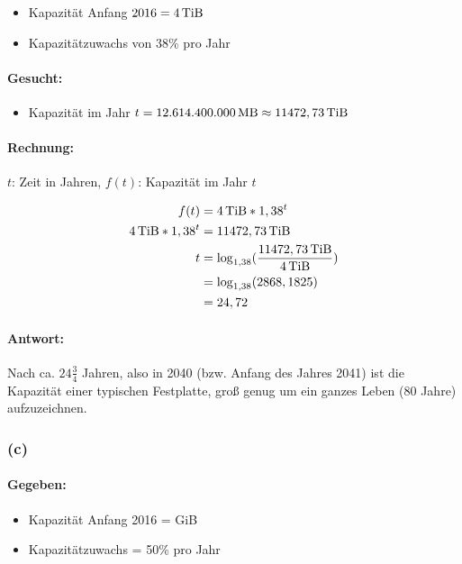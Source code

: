 \documentclass[11pt,a4paper]{article}
\begin{document}
\begin{itemize}
    \item Kapazität Anfang $2016 = \unit[4]{TiB}$
    \item Kapazitätzuwachs von $38\%$ pro Jahr
\end{itemize}

\paragraph{Gesucht:}

\begin{itemize}
    \item Kapazität im Jahr $t = \unit[12.614.400.000]{MB} \approx \unit[11472,73]{TiB}$
\end{itemize}

\paragraph{Rechnung:}

    $t$: Zeit in Jahren, $f(t)$: Kapazität im Jahr $t$

\begin{align}
    f(t) &= \unit[4]{TiB}*1,38^{t}\\
    \unit[4]{TiB} * 1,38^{t} &= \unit[11472,73]{TiB}\\
    t &= \log_{1,38}(\frac{\unit[11472,73]{TiB}}{\unit[4]{TiB}})\\
      &= \log_{1,38}(2868,1825)\\
      &= 24,72
\end{align}

\paragraph{Antwort:}
Nach ca. $24\frac{3}{4}$ Jahren, also in 2040 (bzw. Anfang des Jahres 2041) ist die Kapazität einer typischen Festplatte, groß genug um ein ganzes Leben (80 Jahre) aufzuzeichnen.


\subsubsection{(c)} %

\paragraph{Gegeben:}
\begin{itemize}
    \item Kapazität Anfang 2016 = \unit[128]{GiB}\\
    \item Kapazitätzuwachs = 50\% pro Jahr
\end{itemize}
\end{document}
